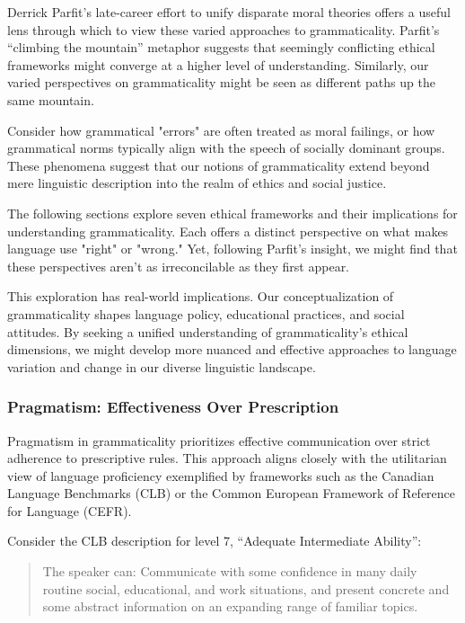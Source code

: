 Derrick Parfit's late-career effort to unify disparate moral theories offers a useful lens through which to view these varied approaches to grammaticality. Parfit's ``climbing the mountain'' metaphor suggests that seemingly conflicting ethical frameworks might converge at a higher level of understanding. Similarly, our varied perspectives on grammaticality might be seen as different paths up the same mountain.

Consider how grammatical "errors" are often treated as moral failings, or how grammatical norms typically align with the speech of socially dominant groups. These phenomena suggest that our notions of grammaticality extend beyond mere linguistic description into the realm of ethics and social justice.

The following sections explore seven ethical frameworks and their implications for understanding grammaticality. Each offers a distinct perspective on what makes language use "right" or "wrong." Yet, following Parfit's insight, we might find that these perspectives aren't as irreconcilable as they first appear.

This exploration has real-world implications. Our conceptualization of grammaticality shapes language policy, educational practices, and social attitudes. By seeking a unified understanding of grammaticality's ethical dimensions, we might develop more nuanced and effective approaches to language variation and change in our diverse linguistic landscape.

\subsubsection{Pragmatism: Effectiveness Over Prescription}

Pragmatism in grammaticality prioritizes effective communication over strict adherence to prescriptive rules. This approach aligns closely with the utilitarian view of language proficiency exemplified by frameworks such as the Canadian Language Benchmarks (CLB) or the Common European Framework of Reference for Language (CEFR).

Consider the CLB description for level 7, ``Adequate Intermediate Ability'':

\begin{quote}
The speaker can: Communicate with some confidence in many daily routine social, educational, and work situations, and present concrete and some abstract information on an expanding range of familiar topics.
\end{quote}

